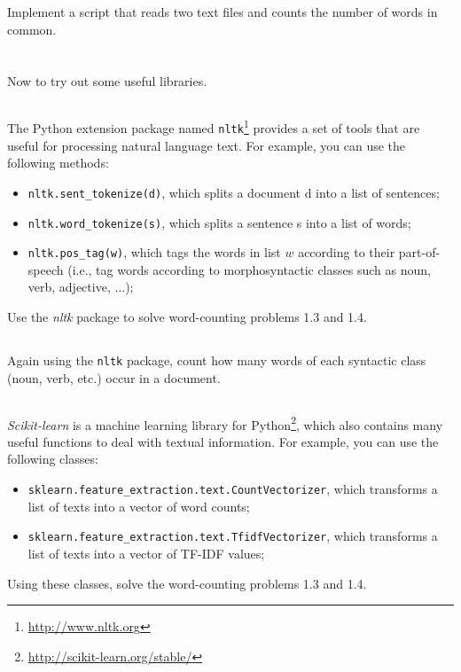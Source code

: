 \documentclass[12pt]{article}
\begin{document}
Implement a script that reads two text files and counts the number of words in common.



\section{}

Now to try out some useful libraries.

\subsection{}

The Python extension package named \texttt{nltk}\footnote{\url{http://www.nltk.org}} provides a set of tools that are useful for processing natural language text. For example, you can use the following methods:

\begin{itemize}
\item \verb+nltk.sent_tokenize(d)+, which splits a document d into a list of sentences;

\item \verb+nltk.word_tokenize(s)+, which splits a sentence s into a list of words;

\item \verb+nltk.pos_tag(w)+, which tags the words in list $w$ according to their part-of-speech (i.e., tag words according to morphosyntactic classes such as noun, verb, adjective, $\ldots$);
\end{itemize}
Use the \emph{nltk} package to solve word-counting problems 1.3 and 1.4.

\subsection{}

Again using the \texttt{nltk} package, count how many words of each syntactic class (noun, verb, etc.) occur in a document.

\subsection{}

\emph{Scikit-learn} is a machine learning library for Python\footnote{\url{http://scikit-learn.org/stable/}}, which also contains many useful functions to deal with textual information. For example, you can use the following classes: 
\begin{itemize}
\item \verb+sklearn.feature_extraction.text.CountVectorizer+, which transforms a list of texts into a vector of word counts;
\item \verb+sklearn.feature_extraction.text.TfidfVectorizer+, which transforms a list of texts into a vector of TF-IDF values;
\end{itemize}
Using these classes, solve the word-counting problems 1.3 and 1.4.
\end{document}
